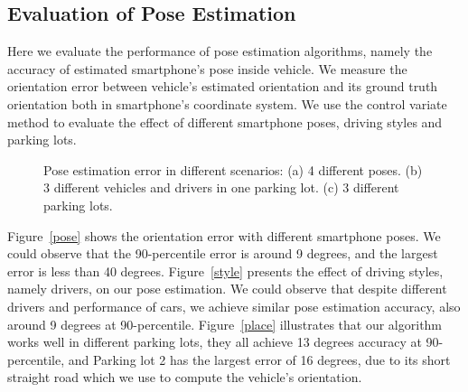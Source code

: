 
\subsection{Evaluation of Pose Estimation}

Here we evaluate the performance of pose estimation algorithms, namely the accuracy of estimated smartphone's pose inside vehicle. We measure the orientation error between vehicle's estimated orientation and its ground truth orientation both in smartphone's coordinate system. We use the control variate method to evaluate the effect of different smartphone poses, driving styles and parking lots.

\begin{figure*}[t]
      \centering
      \vspace{-2pt}
        \caption{Pose estimation error in different scenarios: (a) 4 different poses. (b) 3 different vehicles and drivers in one parking lot. (c) 3 different parking lots.}
\end{figure*}



Figure~\ref{pose} shows the orientation error with different smartphone poses. We could observe that the 90-percentile error is around 9 degrees, and the largest error is less than 40 degrees. Figure~\ref{style} presents the effect of driving styles, namely drivers, on our pose estimation. We could observe that despite different drivers and performance of cars, we achieve similar pose estimation accuracy, also around 9 degrees at 90-percentile. Figure~\ref{place} illustrates that our algorithm works well in different parking lots, they all achieve 13 degrees accuracy at 90-percentile, and Parking lot 2 has the largest error of 16 degrees, due to its short straight road which we use to compute the vehicle's orientation.


